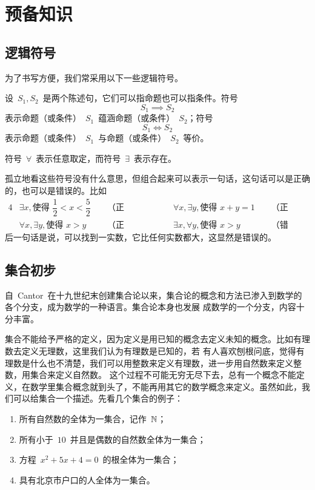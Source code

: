 

\chapter{预备知识}\label{ch:0}

\section{逻辑符号}

为了书写方便，我们常采用以下一些逻辑符号。

设~$S_1,S_2$~是两个陈述句，它们可以指命题也可以指条件。符号
\[
  S_1\implies S_2
\]
表示命题（或条件）~$S_1$~蕴涵命题（或条件）~$S_2$；符号
\[
  S_1\iff S_2
\]
表示命题（或条件）~$S_1$~与命题（或条件）~$S_2$~等价。

符号~$\forall$~表示任意取定，而符号~$\exists$~表示存在。

孤立地看这些符号没有什么意思，但组合起来可以表示一句话，这句话可以是正确的，也可以是错误的。比如
\begin{alignat*}{4}
&\exists x,\text{使得~}\dfrac 12<x<\dfrac 52 &\enspace&\text{（正确）；}
&\qquad&\forall x,\exists y,\text{使得~}x+y=1 &\enspace&\text{（正确）；}\\
&\forall x,\exists y,\text{使得~}x>y & &\text{（正确）；}
&\qquad&\exists x,\forall y,\text{使得~}x>y & &\text{（错误）。}
\end{alignat*}
后一句话是说，可以找到一实数，它比任何实数都大，这显然是错误的。

\section{集合初步}

自~Cantor~在十九世纪末创建集合论以来，集合论的概念和方法已渗入到数学的各个分支，成为数学的一种语言。集合论本身也发展
成数学的一个分支，内容十分丰富。

集合不能给予严格的定义，因为定义是用已知的概念去定义未知的概念。比如有理数去定义无理数，这里我们认为有理数是已知的，若
有人喜欢刨根问底，觉得有理数是什么也不清楚，我们可以用整数来定义有理数，进一步用自然数来定义整数，用集合来定义自然数。%
这个过程不可能无穷无尽下去，总有一个概念不能定义，在数学里集合概念就到头了，不能再用其它的数学概念来定义。虽然如此，我
们可以给集合一个描述。先看几个集合的例子：

\begin{enumerate}
\item 所有自然数的全体为一集合，记作~$\mathbb{N}$；\label{enum:set1}
\item 所有小于~$10$~并且是偶数的自然数全体为一集合；\label{enum:set2}
\item 方程~$x^2+5x+4=0$~的根全体为一集合；\label{enum:set3}
\item 具有北京市户口的人全体为一集合。\label{enum:set4}
\end{enumerate}

